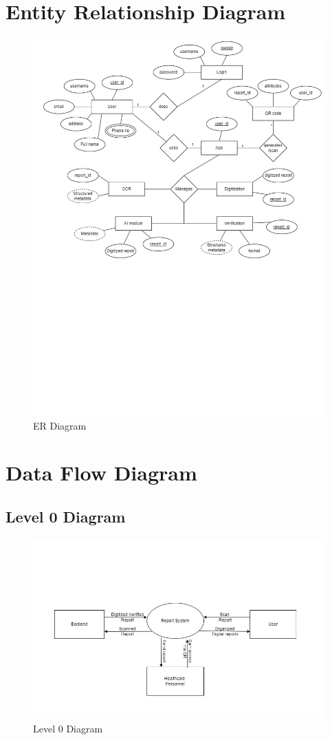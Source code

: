 \section{Entity Relationship Diagram}
\begin{figure}[h]
    \centering
    \includegraphics[width=135mm]{figures/ER_diagram.jpg}
    \caption{ER Diagram}
\end{figure}
\newpage
\section{Data Flow Diagram}
\subsection{Level 0 Diagram}
\begin{figure}[h]
    \centering
    \includegraphics[width=170mm]{figures/Level0.jpg}
    \caption{Level 0 Diagram}
\end{figure}
\newpage
